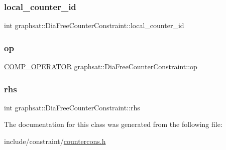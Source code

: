 \subsubsection{\texorpdfstring{local\_counter\_id}{local\_counter\_id}}
{\footnotesize\ttfamily int graphsat\+::\+Dia\+Free\+Counter\+Constraint\+::local\+\_\+counter\+\_\+id\hspace{0.3cm}{\ttfamily [private]}}

\mbox{\label{classgraphsat_1_1_dia_free_counter_constraint_a72c76e83f7b060ae41c6056714d1abc2}} 
\subsubsection{\texorpdfstring{op}{op}}
{\footnotesize\ttfamily \mbox{\hyperlink{namespacegraphsat_acfb5939f9bdafbd9aea0d084b9a56f69}{C\+O\+M\+P\+\_\+\+O\+P\+E\+R\+A\+T\+OR}} graphsat\+::\+Dia\+Free\+Counter\+Constraint\+::op\hspace{0.3cm}{\ttfamily [private]}}

\mbox{\label{classgraphsat_1_1_dia_free_counter_constraint_a71e44a5e077a5d910db1a9a6676fb473}} 
\subsubsection{\texorpdfstring{rhs}{rhs}}
{\footnotesize\ttfamily int graphsat\+::\+Dia\+Free\+Counter\+Constraint\+::rhs\hspace{0.3cm}{\ttfamily [private]}}



The documentation for this class was generated from the following file\+:\begin{DoxyCompactItemize}
\item 
include/constraint/\mbox{\hyperlink{countercons_8h}{countercons.\+h}}\end{DoxyCompactItemize}
